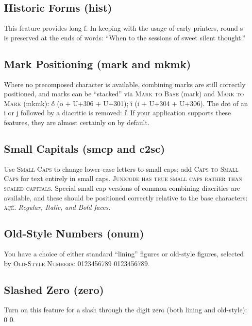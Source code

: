 \documentclass[12pt,a4paper,openany]{book}
\begin{document}
\subsection*{Historic Forms (hist)}

This feature provides long ſ. In keeping with the usage of early printers, round s is preserved
at the ends of words: {“When to the sessions of sweet silent thought.”}

\subsection*{Mark Positioning (mark and mkmk)}

Where no precomposed character is available, combining marks are
still correctly positioned, and marks can be “stacked” via {\scshape Mark
to Base} (mark) and {\scshape Mark to Mark} (mkmk): ŏ́ (o + U+306 + U+301);
ī̆ (i + U+304 + U+306).  The dot of an i or j followed by a diacritic
is removed: i̽. If your application supports these
features, they are almost certainly on by default.

\subsection*{Small Capitals (smcp and c2sc)}

Use {\scshape Small Caps} to change lower-case letters to small caps;
add {\scshape Caps to Small Caps} for text entirely in small
caps. {\scshape Junicode has true small caps rather than scaled
  capitals.} Special small cap versions of common combining diacritics
are available, and these should be positioned correctly relative to
the base characters: {\scshape äçé}. {\itshape Regular, Italic, and
  Bold faces.}

\subsection*{Old-Style Numbers (onum)}

You have a choice of either standard “lining” figures or old-style
figures, selected by {\scshape Old-Style Numbers}: 0123456789
{0123456789.}

\subsection*{Slashed Zero (zero)}

Turn on this feature for a slash through the digit zero (both lining and old-style):
{ 0 { 0}}.
\end{document}
